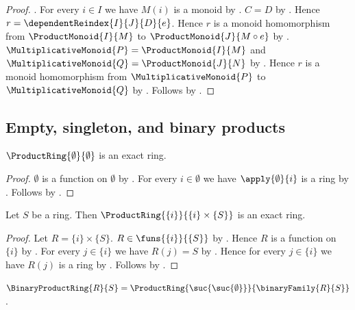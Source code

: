 \begin{proof}
        .
    For every $i\in I$ we have $M(i)$ is a monoid by
        .
    $C=D$ by .
    Hence $r=\dependentReindex{I}{J}{D}{e}$.
    Hence $r$ is a monoid homomorphism from
        $\ProductMonoid{I}{M}$ to $\ProductMonoid{J}{M\circ e}$ by
        .
    $\MultiplicativeMonoid{P}=\ProductMonoid{I}{M}$ and
        $\MultiplicativeMonoid{Q}=\ProductMonoid{J}{N}$ by
        .
    Hence $r$ is a monoid homomorphism from
        $\MultiplicativeMonoid{P}$ to $\MultiplicativeMonoid{Q}$ by
        \auto.
    Follows by .
\end{proof}

\subsection{Empty, singleton, and binary products}

\begin{proposition}\label{empty_product_ring_is_exact}
    $\ProductRing{\emptyset}{\emptyset}$ is an exact ring.
\end{proposition}
\begin{proof}
    $\emptyset$ is a function on $\emptyset$ by
        .
    For every $i\in\emptyset$ we have $\apply{\emptyset}{i}$ is a ring by
        .
    Follows by .
\end{proof}

\begin{proposition}\label{singleton_product_ring_is_exact}
    Let $S$ be a ring.
    Then $\ProductRing{\{i\}}{\{i\}\times\{S\}}$ is an exact ring.
\end{proposition}
\begin{proof}
    Let $R=\{i\}\times\{S\}$.
    $R\in\funs{\{i\}}{\{S\}}$ by .
    Hence $R$ is a function on $\{i\}$ by
        .
    For every $j\in\{i\}$ we have $R(j)=S$ by
        .
    Hence for every $j\in\{i\}$ we have $R(j)$ is a ring by
        \auto.
    Follows by .
\end{proof}

\begin{definition}\label{binary_product_ring}
    $\BinaryProductRing{R}{S}
        =\ProductRing{\suc{\suc{\emptyset}}}{\binaryFamily{R}{S}}$.
\end{definition}

